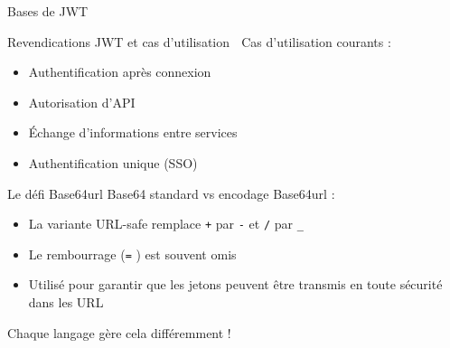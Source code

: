 \documentclass[presentation,aspectratio=169]{beamer}
\begin{document}
\begin{frame}[label={sec:orgf0db282},fragile]{Bases de JWT}
\begin{block}{Revendications JWT et cas d'utilisation 🔰}
\alert{Cas d'utilisation courants :}
\begin{itemize}
\item Authentification après connexion
\item Autorisation d'API
\item Échange d'informations entre services
\item Authentification unique (SSO)
\end{itemize}
\end{block}
\begin{block}{Le défi Base64url}
Base64 standard vs encodage Base64url :
\begin{itemize}
\item La variante URL-safe remplace \texttt{+} par \texttt{-} et \texttt{/} par \texttt{\_}
\item Le rembourrage (\texttt{=} ) est souvent omis
\item Utilisé pour garantir que les jetons peuvent être transmis en toute sécurité dans les URL
\end{itemize}

\alert{Chaque langage gère cela différemment !}
\end{block}
\end{frame}
\end{document}
